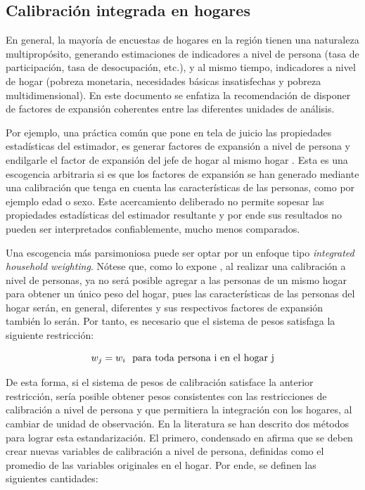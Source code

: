 \documentclass[
  10pt,
  spanish,
]{book}
\begin{document}
\hypertarget{calibraciuxf3n-integrada-en-hogares}{%
\subsection{Calibración integrada en hogares}\label{calibraciuxf3n-integrada-en-hogares}}

En general, la mayoría de encuestas de hogares en la región tienen una naturaleza multipropósito, generando estimaciones de indicadores a nivel de persona (tasa de participación, tasa de desocupación, etc.), y al mismo tiempo, indicadores a nivel de hogar (pobreza monetaria, necesidades básicas insatisfechas y pobreza multidimensional). En este documento se enfatiza la recomendación de disponer de factores de expansión coherentes entre las diferentes unidades de análisis.

Por ejemplo, una práctica común que pone en tela de juicio las propiedades estadísticas del estimador, es generar factores de expansión a nivel de persona y endilgarle el factor de expansión del jefe de hogar al mismo hogar \citep{Alexander_1987}. Esta es una escogencia arbitraria si es que los factores de expansión se han generado mediante una calibración que tenga en cuenta las características de las personas, como por ejemplo edad o sexo. Este acercamiento deliberado no permite sopesar las propiedades estadísticas del estimador resultante y por ende sus resultados no pueden ser interpretados confiablemente, mucho menos comparados.

Una escogencia más parsimoniosa puede ser optar por un enfoque tipo \emph{integrated household weighting}. Nótese que, como lo expone \citet{Heldal_1992}, al realizar una calibración a nivel de personas, ya no será posible agregar a las personas de un mismo hogar para obtener un único peso del hogar, pues las características de las personas del hogar serán, en general, diferentes y sus respectivos factores de expansión también lo serán. Por tanto, es necesario que el sistema de pesos satisfaga la siguiente restricción:

\[
w_j=w_i\ \rm \ para\ toda\ persona\ i\ en\ el\ hogar\ j
\]

De esta forma, si el sistema de pesos de calibración satisface la anterior restricción, sería posible obtener pesos consistentes con las restricciones de calibración a nivel de persona y que permitiera la integración con los hogares, al cambiar de unidad de observación. En la literatura se han descrito dos métodos para lograr esta estandarización. El primero, condensado en \citet{Lemaitre_Dufour_1987} afirma que se deben crear nuevas variables de calibración a nivel de persona, definidas como el promedio de las variables originales en el hogar. Por ende, se definen las siguientes cantidades:
\end{document}
